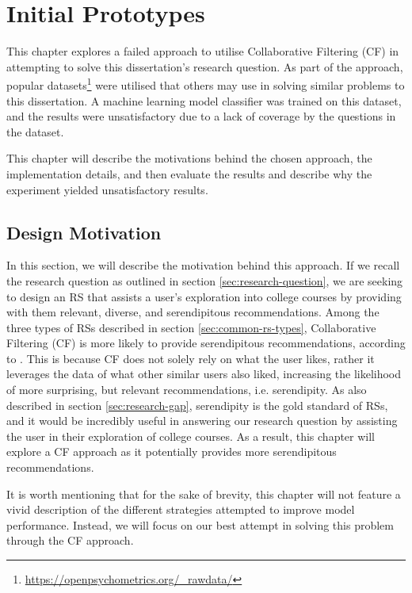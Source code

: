 \chapter{Initial Prototypes}
\label{chap:initial-prototypes}

This chapter explores a failed approach to utilise Collaborative Filtering (CF) in attempting to solve this 
dissertation's research question. 
As part of the approach, popular datasets\footnote{\url{https://openpsychometrics.org/_rawdata/}} were utilised that others may use in solving similar problems to this dissertation.
A machine learning model classifier was trained on this dataset, and the results were unsatisfactory due to a lack of coverage by the questions in the dataset.

This chapter will describe the motivations behind the chosen approach, the implementation details, and then evaluate 
the results and describe why the experiment yielded unsatisfactory results. 

\section{Design Motivation}

In this section, we will describe the motivation behind this approach.
If we recall the research question as outlined in section \ref{sec:research-question},
we are seeking to design an RS that assists a user's exploration into college courses
by providing with them relevant, diverse, and serendipitous recommendations.
Among the three types of RSs described in section \ref{sec:common-rs-types},
Collaborative Filtering (CF) is more likely to provide serendipitous
recommendations, according to \cite{aggarwal2016recommender}.
This is because CF does not solely rely on what the user likes, rather it leverages the data of what other similar users also liked, 
increasing the likelihood of more surprising, but relevant recommendations, i.e. serendipity.
As also described in section \ref{sec:research-gap}, 
serendipity is the gold standard of RSs, and it would be incredibly useful in answering our research question by assisting the user in their exploration of college courses.
As a result, this chapter will explore a CF approach as it potentially provides more serendipitous recommendations.

It is worth mentioning that for the sake of brevity, 
this chapter will not feature a vivid description of the different strategies attempted to improve model performance.
Instead, we will focus on our best attempt in solving this problem through the CF approach.

